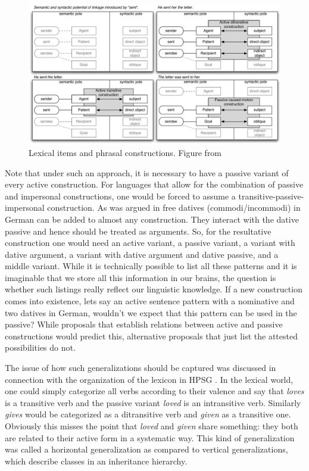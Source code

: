 \begin{figure}
\includegraphics[width=\textwidth]{Figures/2011-van-Trijp.pdf}
\caption{\label{fig-as-trijp}Lexical items and phrasal constructions. Figure %
from }
\end{figure}%

Note that under such an approach, it is necessary to have a passive variant of every active
construction. For languages that allow for the combination of passive and impersonal constructions,
one would be forced to assume a transitive-passive-impersonal construction. As was argued in
 free datives (commodi/incommodi) in German can be added to almost
any construction. They interact with the dative passive and hence should be treated as
arguments. So, for the resultative construction one would need an active variant, a passive variant,
a variant with dative argument, a variant with dative argument and dative passive, and a middle variant.
While it is technically possible to list all these patterns and it is imaginable that we store all
this information in our brains, the question is whether such listings really reflect our linguistic
knowledge. If a new construction comes into existence, lets say an active sentence pattern with a
nominative and two datives in German, wouldn't we expect that this pattern can be used in the
passive? While proposals that establish relations between active and passive constructions would
predict this, alternative proposals that just list the attested possibilities do not.

\addlines
The issue of how such generalizations should be captured was discussed in connection with the
organization of the lexicon in HPSG \citep{Flickinger87,Meurers2001a}. In the lexical world, one could simply categorize all verbs according to their
valence and say that \emph{loves} is a transitive verb and the passive variant \emph{loved} is an
intransitive verb. Similarly \emph{gives} would be categorized as a ditransitive verb and
\emph{given} as a transitive one. Obviously this misses the point that \emph{loved} and \emph{given}
share something: they both are related to their active form in a systematic way. This kind of
generalization was called a horizontal generalization as compared to vertical generalizations, which
describe classes in an inheritance hierarchy.

